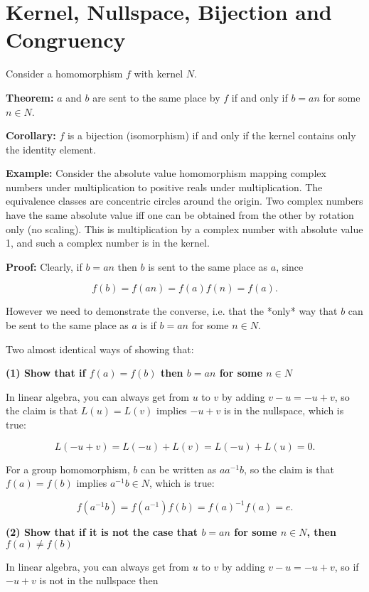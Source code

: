 \section{Kernel, Nullspace, Bijection and Congruency}

Consider a homomorphism $f$ with kernel $N$.

\textbf{Theorem:} $a$ and $b$ are sent to the same place by $f$ if and only if
$b = an$ for some $n \in N$.

\textbf{Corollary:} $f$ is a bijection (isomorphism) if and only if the kernel
contains only the identity element.

\textbf{Example:} Consider the absolute value homomorphism mapping complex numbers
under multiplication to positive reals under multiplication. The equivalence
classes are concentric circles around the origin. Two complex numbers have the
same absolute value iff one can be obtained from the other by rotation only (no
scaling). This is multiplication by a complex number with absolute value 1, and
such a complex number is in the kernel.

\textbf{Proof:} Clearly, if $b = an$ then $b$ is sent to the same place as $a$,
since

$$
f(b) = f(an) = f(a)f(n) = f(a).
$$

However we need to demonstrate the converse, i.e. that the *only* way that $b$
can be sent to the same place as $a$ is if $b=an$ for some $n \in N$.

Two almost identical ways of showing that:

\textbf{(1) Show that if $f(a) = f(b)$ then $b = an$ for some $n \in N$}

In linear algebra, you can always get from $u$ to $v$ by adding $v - u = -u +
v$, so the claim is that $L(u) = L(v)$ implies $-u + v$ is in the nullspace,
which is true:

$$
L(-u + v) = L(-u) + L(v) = L(-u) + L(u) = 0.
$$

For a group homomorphism, $b$ can be written as $aa^{-1}b$, so the claim is
that $f(a) = f(b)$ implies $a^{-1}b \in N$, which is true:

$$
f(a^{-1}b) = f(a^{-1})f(b) = f(a)^{-1}f(a) = e.
$$

\textbf{(2) Show that if it is not the case that $b = an$ for some $n \in N$, then $f(a) \neq f(b)$}

In linear algebra, you can always get from $u$ to $v$ by adding $v - u = -u + v$,
so if $-u + v$ is not in the nullspace then

